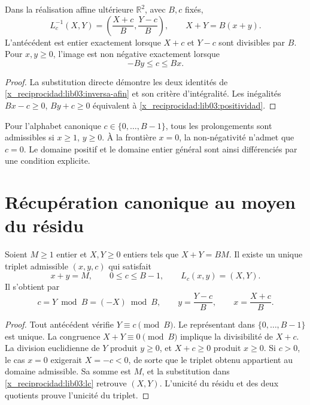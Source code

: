\begin{proposition}
\label{x_reciprocidad:lib03:prop-inversa}
Dans la réalisation affine ultérieure \(\mathbb R^2\), avec \(B,c\) fixés,
\begin{equation}
 L_c^{-1}(X,Y)=\left(\frac{X+c}{B},\frac{Y-c}{B}\right),\qquad
 X+Y=B(x+y).
 \label{x_reciprocidad:lib03:inversa-afin}
\end{equation}
L’antécédent est entier exactement lorsque \(X+c\) et \(Y-c\) sont
divisibles par \(B\). Pour \(x,y\geq0\), l’image est non négative
exactement lorsque
\begin{equation}
 -By\leq c\leq Bx.
 \label{x_reciprocidad:lib03:positividad}
\end{equation}
\end{proposition}

\begin{proof}
La substitution directe démontre les deux identités de
\eqref{x_reciprocidad:lib03:inversa-afin} et son critère d’intégralité. Les
inégalités \(Bx-c\geq0\), \(By+c\geq0\) équivalent à
\eqref{x_reciprocidad:lib03:positividad}.
\end{proof}

Pour l'alphabet canonique \(c\in\{0,\ldots,B-1\}\), tous les prolongements sont admissibles si \(x\geq1\), \(y\geq0\). À la frontière \(x=0\), la non-négativité n'admet que \(c=0\). Le domaine positif et le domaine entier général sont ainsi différenciés par une condition explicite.

\section{Récupération canonique au moyen du résidu}
\label{x_reciprocidad:lib03:residuo}

\begin{theorem}
\label{x_reciprocidad:lib03:teo-residuo}
Soient \(M\geq1\) entier et \(X,Y\geq0\) entiers tels que
\(X+Y=BM\). Il existe un unique triplet admissible \((x,y,c)\) qui satisfait
\[
 x+y=M,\qquad 0\leq c\leq B-1,\qquad L_c(x,y)=(X,Y).
\]
Il s’obtient par
\begin{equation}
 c=Y\bmod B=(-X)\bmod B,\qquad
 y=\frac{Y-c}{B},\qquad x=\frac{X+c}{B}.
 \label{x_reciprocidad:lib03:residuo-inversor}
\end{equation}
\end{theorem}

\begin{proof}
Tout antécédent vérifie \(Y\equiv c\pmod B\). Le représentant dans
\(\{0,\ldots,B-1\}\) est unique. La congruence \(X+Y\equiv0\pmod B\)
implique la divisibilité de \(X+c\). La division euclidienne de \(Y\)
produit \(y\geq0\), et \(X+c\geq0\) produit \(x\geq0\). Si
\(c>0\), le cas \(x=0\) exigerait \(X=-c<0\), de sorte que le
triplet obtenu appartient au domaine admissible. Sa somme est \(M\), et
la substitution dans \eqref{x_reciprocidad:lib03:lc} retrouve \((X,Y)\). L’unicité
du résidu et des deux quotients prouve l’unicité du triplet.
\end{proof}

